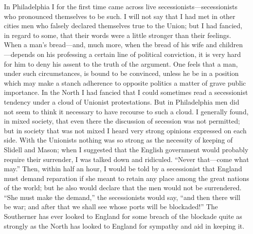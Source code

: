 In Philadelphia I for the first time came across live
secessionists---secessionists who pronounced themselves to be such.
I will not say that I had met in other cities men who falsely
declared themselves true to the Union; but I had fancied, in regard
to some, that their words were a little stronger than their
feelings.  When a man's bread---and, much more, when the bread of
his wife and children---depends on his professing a certain line of
political conviction, it is very hard for him to deny his assent to
the truth of the argument.  One feels that a man, under such
circumstances, is bound to be convinced, unless he be in a position
which may make a stanch adherence to opposite politics a matter of
grave public importance.  In the North I had fancied that I could
sometimes read a secessionist tendency under a cloud of Unionist
protestations.  But in Philadelphia men did not seem to think it
necessary to have recourse to such a cloud.  I generally found, in
mixed society, that even there the discussion of secession was not
permitted; but in society that was not mixed I heard very strong
opinions expressed on each side.  With the Unionists nothing was so
strong as the necessity of keeping of Slidell and Mason; when I
suggested that the English government would probably require their
surrender, I was talked down and ridiculed.  ``Never that---come what
may.''  Then, within half an hour, I would be told by a secessionist
that England must demand reparation if she meant to retain any
place among the great nations of the world; but he also would
declare that the men would not be surrendered.  ``She must make the
demand,'' the secessionists would say, ``and then there will be war;
and after that we shall see whose ports will be blockaded!''  The
Southerner has ever looked to England for some breach of the
blockade quite as strongly as the North has looked to England for
sympathy and aid in keeping it.

